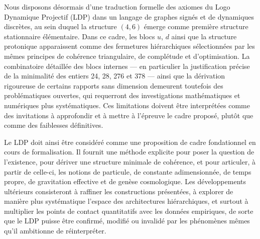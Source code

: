 \documentclass[11pt,a4paper]{article}
\begin{document}
Nous disposons désormais d’une traduction formelle des axiomes du Logo Dynamique Projectif (LDP) dans un langage de graphes signés et de dynamiques discrètes, au sein duquel la structure \(\left(4,6\right)\) émerge comme première structure stationnaire élémentaire. Dans ce cadre, les blocs \(u\), \(d\) ainsi que la structure protonique apparaissent comme des fermetures hiérarchiques sélectionnées par les mêmes principes de cohérence triangulaire, de complétude et d’optimisation. La combinatoire détaillée des blocs internes — en particulier la justification précise de la minimalité des entiers 24, 28, 276 et 378 — ainsi que la dérivation rigoureuse de certains rapports sans dimension demeurent toutefois des problématiques ouvertes, qui requerront des investigations mathématiques et numériques plus systématiques. Ces limitations doivent être interprétées comme des invitations à approfondir et à mettre à l’épreuve le cadre proposé, plutôt que comme des faiblesses définitives.

Le LDP doit ainsi être considéré comme une proposition de cadre fondationnel en cours de formalisation. Il fournit une méthode explicite pour poser la question de l’existence, pour dériver une structure minimale de cohérence, et pour articuler, à partir de celle-ci, les notions de particule, de constante adimensionnée, de temps propre, de gravitation effective et de genèse cosmologique. Les développements ultérieurs consisteront à raffiner les constructions présentées, à explorer de manière plus systématique l’espace des architectures hiérarchiques, et surtout à multiplier les points de contact quantitatifs avec les données empiriques, de sorte que le LDP puisse être confirmé, modifié ou invalidé par les phénomènes mêmes qu’il ambitionne de réinterpréter.
\end{document}

